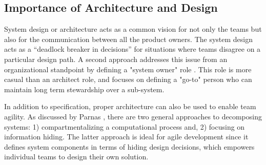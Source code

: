 \subsection{Importance of Architecture and Design}\label{sec:imp_of_dsgn}

System design or architecture acts as a common vision for not only the teams but also for the communication between all the product owners.
The system design acts as a “deadlock breaker in decisions” \cite{architecureRole_article} for situations where teams disagree on a particular design path.
A second approach addresses this issue from an organizational standpoint by defining a "system owner" role \cite{kniberg12}.
This role is more casual than an architect role, and focuses on defining a "go-to" person who can maintain long term stewardship over a sub-system. 

In addition to specification, proper architecture can also be used to enable team agility.
As discussed by Parnas \cite{Parnas72}, there are two general approaches to decomposing systems: 1) compartmentalizing a computational process and, 2) focusing on information hiding.
The latter approach is ideal for agile development since it defines system components in terms of hiding design decisions, which empowers individual teams to design their own solution.